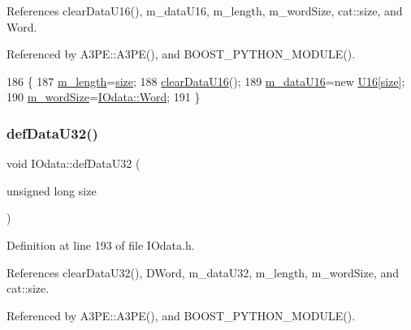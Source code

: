 References clear\+Data\+U16(), m\+\_\+data\+U16, m\+\_\+length, m\+\_\+word\+Size, cat\+::size, and Word.



Referenced by A3\+P\+E\+::\+A3\+P\+E(), and B\+O\+O\+S\+T\+\_\+\+P\+Y\+T\+H\+O\+N\+\_\+\+M\+O\+D\+U\+L\+E().


\begin{DoxyCode}
186                                      \{
187     \hyperlink{classIOdata_afabe57441da019eb614d277799106aac}{m\_length}=\hyperlink{namespacecat_a3eae50bb86a614752045105e00365a46}{size};
188     \hyperlink{classIOdata_a13016f489aba6e80cd7be53224c3e8ab}{clearDataU16}();
189     \hyperlink{classIOdata_a8d698e077b7898009691b9086a3e6453}{m\_dataU16}=\textcolor{keyword}{new} \hyperlink{ICECALv3_8h_adf928e51a60dba0df29d615401cc55a8}{U16}[\hyperlink{namespacecat_a3eae50bb86a614752045105e00365a46}{size}];
190     \hyperlink{classIOdata_a719b0ce607ada4fa91b12d6ecfa1b4c9}{m\_wordSize}=\hyperlink{classIOdata_a37c53ebf4bf8d866aac8af572962a84ca7d603e9c9a55e3c8dffa4bd8e3dca491}{IOdata::Word};
191   \}
\end{DoxyCode}
\mbox{\label{classIOdata_a78e50aa4a6c967cba195e77fe911a8c3}} 
\subsubsection{\texorpdfstring{def\+Data\+U32()}{defDataU32()}}
{\footnotesize\ttfamily void I\+Odata\+::def\+Data\+U32 (\begin{DoxyParamCaption}\item[{unsigned long}]{size }\end{DoxyParamCaption})\hspace{0.3cm}{\ttfamily [inline]}}



Definition at line 193 of file I\+Odata.\+h.



References clear\+Data\+U32(), D\+Word, m\+\_\+data\+U32, m\+\_\+length, m\+\_\+word\+Size, and cat\+::size.



Referenced by A3\+P\+E\+::\+A3\+P\+E(), and B\+O\+O\+S\+T\+\_\+\+P\+Y\+T\+H\+O\+N\+\_\+\+M\+O\+D\+U\+L\+E().


